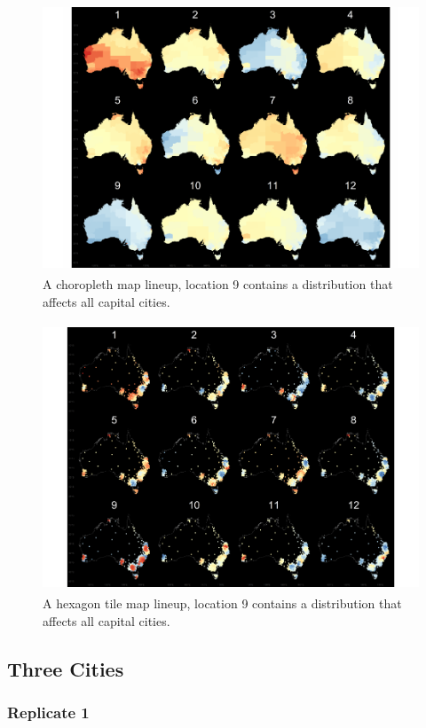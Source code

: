 \documentclass{monashthesis}
\begin{document}
\begin{figure}[H]
\centering
\includegraphics[height=8cm]{lineups/cities-geo9-1.pdf}
\caption{\label{fig:cities-geo9}A choropleth map lineup, location 9 contains a distribution that affects all capital cities.}
\end{figure}

\begin{figure}[H]
\centering
\includegraphics[height=8cm]{lineups/cities-hex9-1.pdf}
\caption{\label{fig:cities-hex9}A hexagon tile map lineup, location 9 contains a distribution that affects all capital cities.}
\end{figure}

\newpage

\hypertarget{three-cities}{%
\subsection{Three Cities}\label{three-cities}}

\hypertarget{replicate-1-1}{%
\subsubsection{Replicate 1}\label{replicate-1-1}}
\end{document}
